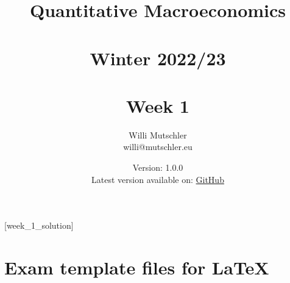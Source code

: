 
\newif\ifDisplaySolutions%


\title{Quantitative Macroeconomics\\~\\Winter 2022/23\\~\\Week 1}
\author{Willi Mutschler\\willi@mutschler.eu}
\date{Version: 1.0.0\\Latest version available on: \href{https://github.com/wmutschl/Quantitative-Macroeconomics/releases/latest/download/week1.pdf}{GitHub}}
\maketitle\thispagestyle{empty}

\newpage
{}[week_1_solution]
\tableofcontents\thispagestyle{empty}\newpage

\setcounter{page}{1}
\newpage
\newpage
\newpage
\newpage
\printbibliography
\newpage
\appendix
\section{Exam template files for \LaTeX}




\ifDisplaySolutions
\newpage
\section{Solutions}

\fi
